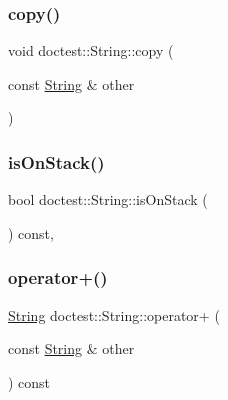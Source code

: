 \mbox{\label{classdoctest_1_1String_a9adde1fae310e0d1a394cc1383495572}} 
\subsubsection{\texorpdfstring{copy()}{copy()}}
{\footnotesize\ttfamily void doctest\+::\+String\+::copy (\begin{DoxyParamCaption}\item[{const \hyperlink{classdoctest_1_1String}{String} \&}]{other }\end{DoxyParamCaption})\hspace{0.3cm}{\ttfamily [private]}}

\mbox{\label{classdoctest_1_1String_abdd2799b06103994c5ac26fa9715849d}} 
\subsubsection{\texorpdfstring{is\+On\+Stack()}{isOnStack()}}
{\footnotesize\ttfamily bool doctest\+::\+String\+::is\+On\+Stack (\begin{DoxyParamCaption}{ }\end{DoxyParamCaption}) const\hspace{0.3cm}{\ttfamily [inline]}, {\ttfamily [private]}}

\mbox{\label{classdoctest_1_1String_a6ddb6cf1b744a0ae1d4e26b3c8dfa827}} 
\subsubsection{\texorpdfstring{operator+()}{operator+()}}
{\footnotesize\ttfamily \hyperlink{classdoctest_1_1String}{String} doctest\+::\+String\+::operator+ (\begin{DoxyParamCaption}\item[{const \hyperlink{classdoctest_1_1String}{String} \&}]{other }\end{DoxyParamCaption}) const}

